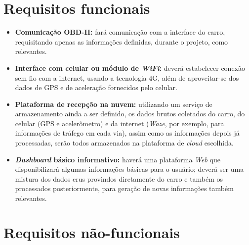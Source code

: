 \section{Requisitos funcionais}
\begin{itemize}
    \item \textbf{Comunicação OBD-II:} fará comunicação com a interface do carro, requisitando apenas as informações definidas, durante o projeto, como relevantes.
    
    \item \textbf{Interface com celular ou módulo de \textit{WiFi}:} deverá estabelecer conexão sem fio com a internet, usando a tecnologia 4G, além de aproveitar-se dos dados de GPS e de aceleração fornecidos pelo celular.
    
    \item \textbf{Plataforma de recepção na nuvem:} utilizando um serviço de armazenamento ainda a ser definido, os dados brutos coletados do carro, do celular (GPS e acelerômetro) e da internet (\textit{Waze}, por exemplo, para informações de tráfego em cada via), assim como as informações depois já processadas, serão todos armazenados na plataforma de \textit{cloud} escolhida.
    
    \item \textbf{\textit{Dashboard} básico informativo:} haverá uma plataforma \textit{Web} que disponibilizará algumas informações básicas para o usuário; deverá ser uma mistura dos dados crus provindos diretamente do carro e também os processados posteriormente, para geração de novas informações também relevantes.
\end{itemize}

\section{Requisitos não-funcionais}

